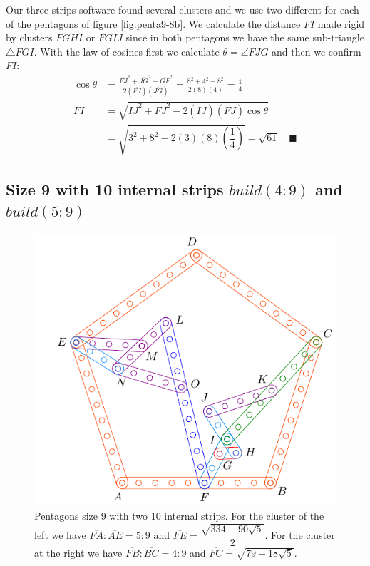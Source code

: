 \documentclass[11pt]{article}
\begin{document}
Our three-strips software found several clusters and we use two different for each of the pentagons of figure \ref{fig:penta9-8b}. We calculate the distance $\overline{FI}$ made rigid by clusters $FGHI$ or $FGIJ$ since in both pentagons we have the same sub-triangle $\triangle{FGI}$. With the law of cosines first we calculate $\theta = \angle{FJG}$ and then we confirm $\overline{FI}$:
\begin{align}
\cos\theta &= \frac{\overline{FJ}^2 + \overline{JG}^2 - \overline{GF}^2}
 {2(\overline{FJ})(\overline{JG})}
 = \frac{8^2 + 4^2 - 8^2}{2(8)(4)} = \frac{1}4 \nonumber\\
\overline{FI} &= \sqrt{\overline{IJ}^2 + \overline{FJ}^2 
 - 2(\overline{IJ})(\overline{FJ})\cos\theta} \nonumber\\
 &= \sqrt{3^2 + 8^2 - 2(3)(8)\left(\dfrac{1}4\right)} = \sqrt{61} \quad\blacksquare
\end{align}

\subsection{Size 9 with 10 internal strips $build(4:9)$ and $build(5:9)$}

\begin{figure}[H]
 \centering
 \includegraphics[scale=0.9]{9/penta9b}
 \caption{Pentagons size 9 with two 10 internal strips. For the cluster of the left we have $\overline{FA}:\overline{AE} = 5:9$ and $\overline{FE} = \dfrac{\sqrt{334 + 90\sqrt5}}2$. For the cluster at the right we have $\overline{FB}:\overline{BC} = 4:9$ and $\overline{FC}=\sqrt{79 + 18\sqrt5}$.}
 \label{fig:penta9b}
\end{figure}
\end{document}
